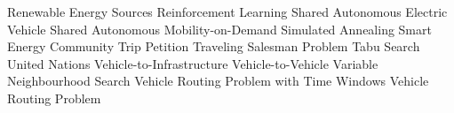 \begin{acronym}
         Renewable Energy Sources  
          Reinforcement Learning  
         Shared Autonomous Electric Vehicle  
        Shared Autonomous Mobility-on-Demand  
          Simulated Annealing  
         Smart Energy Community  
         Trip Petition 
         Traveling Salesman Problem  
           Tabu Search  
         United Nations  
          Vehicle-to-Infrastructure  
          Vehicle-to-Vehicle  
          Variable Neighbourhood Search  
       Vehicle Routing Problem with Time Windows  
         Vehicle Routing Problem  
\end{acronym}
